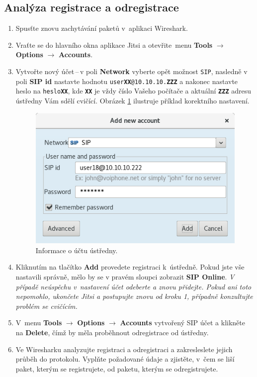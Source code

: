 \subsection{Analýza registrace a odregistrace}
\begin{enumerate}
    \item Spusťte znovu zachytávání paketů v aplikaci Wireshark.
    \item Vraťte se do hlavního okna aplikace Jitsi a otevřite menu {\bf Tools} $\rightarrow$ {\bf Options} $\rightarrow$ {\bf Accounts}.
    \item Vytvořte nový účet\,--\,v poli {\bf Network} vyberte opět možnost {\tt SIP}, nasledně v poli {\bf SIP id} nastavte hodnotu {\tt user{\bf XX}@10.10.10.{\bf ZZZ}} a nakonec nastavte heslo na {\tt heslo{\bf XX}}, kde {\tt\bf XX} je vždy číslo Vašeho počítače a aktuální {\tt\bf ZZZ} adresu ústředny Vám sdělí cvičící.
     Obrázek \ref{fig:sip_account} ilustruje příklad korektního nastavení.
\begin{figure}[h!]
  \centering
  \includegraphics[scale=0.5]{img/account_asterisk.png}
  \caption{Informace o účtu ústředny.}
  \label{fig:sip_account}
\end{figure}
    \item Kliknutím na tlačítko {\bf Add} provedete registraci k ústředně.
    Pokud jste vše nastavili správně, mělo by se v pravém sloupci zobrazit {\bf SIP Online}. 
    {\it V případě neúspěchu v nastavení účet odeberte a znovu přidejte. Pokud ani toto nepomohlo, ukončete Jitsi a postupujte znovu od kroku 1, případně konzultujte problém se cvičícím.}
    \item V menu {\bf Tools} $\rightarrow$ {\bf Options} $\rightarrow$ {\bf Accounts} vytvořený SIP účet a klikněte na {\bf Delete}, čímž by měla proběhnout odregistrace od ústředny.
    \item Ve Wiresharku analyzujte registraci a odregistraci a zakresleslete jejich průběh do protokolu. Vyplňte požadované údaje a zjistěte, v čem se liší paket, kterým se registrujete, od paketu, kterým se odregistrujete.
\end{enumerate}


